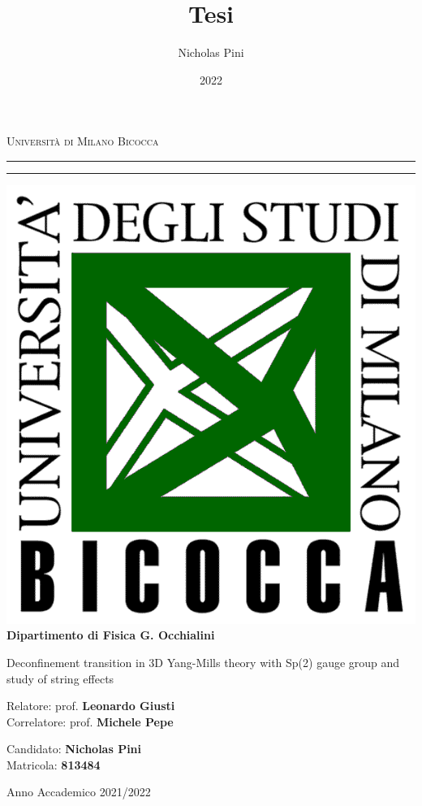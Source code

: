 \documentclass[reqno,12pt]{article}
\title{Tesi}
\date{2022}
\author{Nicholas Pini}
\numberwithin{equation}{section}
\begin{document}
\begin{titlepage}
	\begin{center}
		{{\Large{\textsc{Università di  Milano Bicocca}}}} \rule[0.1cm]{14cm}{0.1mm}
		\rule[0.5cm]{14cm}{0.6mm}
		\includegraphics[scale=0.45]{logo.png}\\
		{\small{\bf Dipartimento di Fisica G. Occhialini}}
					
	\end{center}
	\vspace{10mm}
	\begin{center}
			{\LARGE{Deconfinement transition in 3D Yang-Mills theory with Sp(2) gauge group and study of string effects}}\\
			\vspace{13mm}{\large Tesi di laurea magistrale}
	\end{center}
	\vspace{15mm}
	\par
	\noindent
	\begin{minipage}[t]{0.60\textwidth}
	{
		Relatore: prof. {\bf Leonardo Giusti}\\
		Correlatore: prof. {\bf Michele Pepe}\\
	}
	\end{minipage}
	\hfill
	\begin{minipage}[t]{0.40\textwidth}\raggedleft
			{Candidato: {\bf Nicholas Pini}\\
			Matricola: {\bf 813484}}
	\end{minipage}
	\begin{center}
	{Anno Accademico 2021/2022}
	\end{center}
\end{titlepage}
\end{document}
